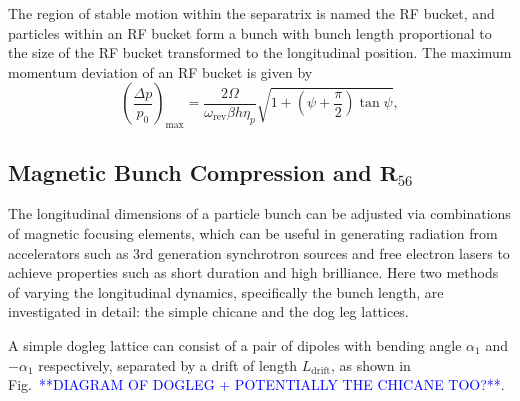 \documentclass[../main.tex]{subfiles}
\begin{document}
The region of stable motion within the separatrix is named the RF bucket, and particles within an RF bucket form a bunch with bunch length proportional to the size of the RF bucket transformed to the longitudinal position. The maximum momentum deviation of an RF bucket is given by \cite{wolski2012longitudinal}
\begin{equation}
\left(\frac{\Delta p}{p_{0}}\right)_{\mathrm{max}} = \frac{2\Omega}{\omega_{\mathrm{rev}}\beta h\eta_{p}}\sqrt{1+\left(\psi+\frac{\pi}{2}\right)\tan\psi},
\label{eq:RF_bucket_momentum_deviation}    
\end{equation}

\subsection{Magnetic Bunch Compression and $\boldsymbol{R}_{56}$}

The longitudinal dimensions of a particle bunch can be adjusted via combinations of magnetic focusing elements, which can be useful in generating radiation from accelerators such as 3rd generation synchrotron sources and free electron lasers to achieve properties such as short duration and high brilliance. Here two methods of varying the longitudinal dynamics, specifically the bunch length, are investigated in detail: the simple chicane and the dog leg lattices.

A simple dogleg lattice can consist of a pair of dipoles with bending angle $\alpha_{1}$ and $-\alpha_{1}$ respectively, separated by a drift of length $L_{\mathrm{drift}}$, as shown in Fig.~\textcolor{blue}{**DIAGRAM OF DOGLEG + POTENTIALLY THE CHICANE TOO?**}.
\end{document}
